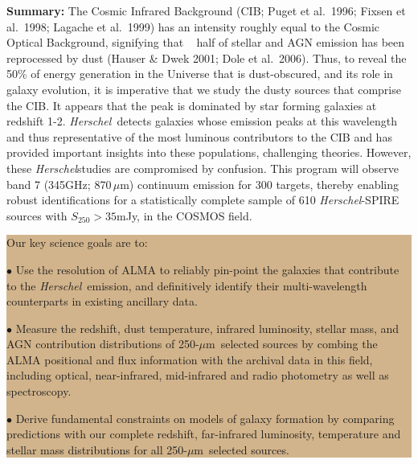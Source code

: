 \documentclass[12pt,a4paper]{article}
\newcommand{\herschel}{{\it Herschel}}
\newcommand{\ea}{et~al.}
\newcommand{\micron}{$\mu$m}
\begin{document}
{\bf Summary: }
%
The Cosmic Infrared Background (CIB; Puget et al.\ 1996; Fixsen et
al.\ 1998; Lagache et al.\ 1999) has an intensity roughly equal to the
Cosmic Optical Background, signifying that ~ half of stellar
and AGN emission has been
reprocessed by dust (Hauser \& Dwek 2001; Dole et al.\ 2006). Thus, to
reveal the 50\% of energy generation in the Universe that is dust-obscured, and
its role in galaxy evolution, it is imperative that we study the dusty
sources that comprise the CIB. It appears that the peak is dominated by star forming galaxies at redshift 1-2. \herschel\ detects galaxies whose emission peaks at this wavelength and thus representative of the most luminous contributors to the CIB and has provided important insights into these populations, challenging theories. However, these \herschel studies are compromised by confusion.  
%
This program will observe band 7 (345GHz; 870\,\micron) continuum
emission for 300 targets, thereby enabling robust identifications for a statistically complete sample of
610 \herschel-SPIRE sources with $S_{250}>35$mJy, in the COSMOS field.
\indent\indent\colorbox{tan}{
\begin{minipage}{16cm}
\noindent Our key science goals are to:

$\bullet$ Use the resolution of ALMA to reliably pin-point the galaxies
that contribute to the \herschel\ emission, and definitively identify
their multi-wavelength counterparts in existing ancillary data.


$\bullet$ Measure the redshift, dust temperature, infrared luminosity,
stellar mass, and AGN contribution distributions of 250-\micron\
selected sources by combing the ALMA positional and flux information
with the archival data in this field, including optical, near-infrared, mid-infrared and radio photometry as well as spectroscopy.

$\bullet$ Derive fundamental constraints on models of galaxy formation
by comparing predictions with our complete redshift, far-infrared
luminosity, temperature and stellar mass distributions for all
250-\micron\ selected sources.

\end{minipage}}
\end{document}
